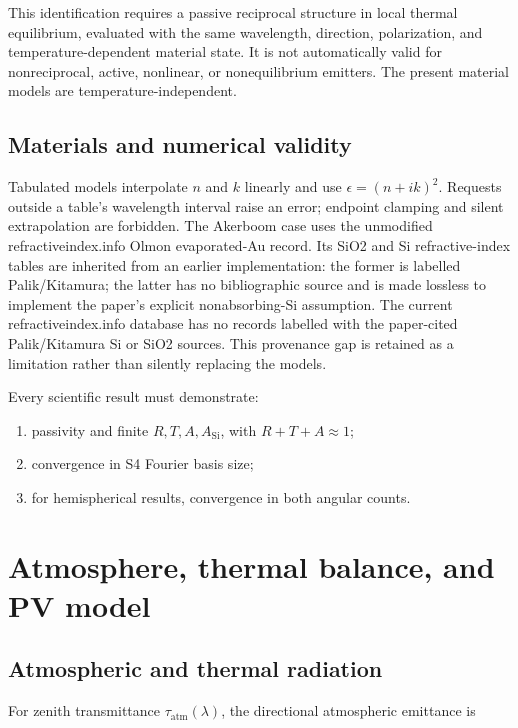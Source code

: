 \documentclass[11pt,a4paper,twoside]{article}
\begin{document}
This identification requires a passive reciprocal structure in local thermal
equilibrium, evaluated with the same wavelength, direction, polarization, and
temperature-dependent material state. It is not automatically valid for
nonreciprocal, active, nonlinear, or nonequilibrium emitters. The present
material models are temperature-independent.

\subsection{Materials and numerical validity}
\label{sec:materials}

Tabulated models interpolate \(n\) and \(k\) linearly and use
\(\epsilon=(n+ik)^2\). Requests outside a table's wavelength interval raise an
error; endpoint clamping and silent extrapolation are forbidden. The Akerboom case
uses the unmodified refractiveindex.info Olmon evaporated-Au record. Its
SiO2 and Si refractive-index tables are inherited from an earlier
implementation: the former is labelled Palik/Kitamura; the latter has
no bibliographic source and is made lossless to implement the paper's explicit
nonabsorbing-Si assumption. The current refractiveindex.info database has no
records labelled with the paper-cited Palik/Kitamura Si or SiO2 sources. This
provenance gap is retained as a limitation rather than silently replacing the
models.

Every scientific result must demonstrate:

\begin{enumerate}
  \item passivity and finite \(R,T,A,A_{\mathrm{Si}}\), with
        \(R+T+A\approx1\);
  \item convergence in S4 Fourier basis size;
  \item for hemispherical results, convergence in both angular counts.
\end{enumerate}

\section{Atmosphere, thermal balance, and PV model}

\subsection{Atmospheric and thermal radiation}
\label{sec:atmosphere}

For zenith transmittance \(\tau_{\mathrm{atm}}(\lambda)\), the directional
atmospheric emittance is
\end{document}
